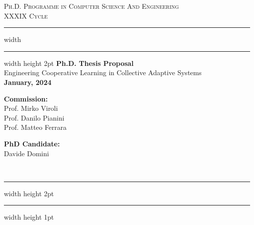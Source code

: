 \documentclass[12pt]{article}
\begin{document}
\begin{titlepage}

	\newcommand{\HRule}{\rule{\linewidth}{0.5mm}}
	\center
	
	\textsc{\Large Ph.D. Programme in Computer Science And Engineering}\\[0.5cm]
	
	\textsc{\Large XXXIX Cycle}\\[0.6cm]
	
	\hrule width \hsize \kern 1mm \hrule width \hsize height 2pt 
	\vspace{0.8cm}
	{ \large \bfseries Ph.D. Thesis Proposal}\\[0.6cm]
	{ \large Engineering Cooperative Learning in Collective Adaptive Systems}\\[0.6cm]
	
	
	
	\bfseries{January, 2024}


    \vspace{1.5cm}
    
    \noindent
    \begin{minipage}[t]{0.45\textwidth}
        \raggedright
        \textbf{Commission:}\\[0.5cm]
        Prof. Mirko Viroli\\
        Prof. Danilo Pianini\\
        Prof. Matteo Ferrara
    \end{minipage}%
    \hfill
    \begin{minipage}[t]{0.45\textwidth}
        \raggedleft
        \textbf{PhD Candidate:}\\[0.5cm]
        Davide Domini
    \end{minipage} \\[0.6cm]
	

	\hrule width \hsize height 2pt \kern 1mm \hrule width \hsize height 1pt
	\vspace{0.4cm}
	
\end{titlepage}
\end{document}
